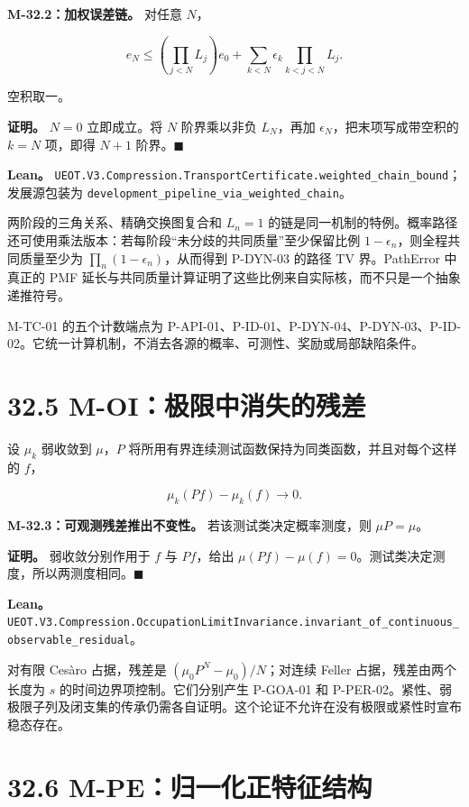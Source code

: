 \documentclass[
  11pt,
  oneside]{book}
\begin{document}
\textbf{M-32.2：加权误差链。} 对任意 \(N\)，

\[e_N\le \left(\prod_{j<N}L_j\right)e_0+
\sum_{k<N}\epsilon_k\prod_{k<j<N}L_j.\]

空积取一。

\textbf{证明。} \(N=0\) 立即成立。将 \(N\) 阶界乘以非负 \(L_N\)，再加 \(\epsilon_N\)，把末项写成带空积的 \(k=N\) 项，即得 \(N+1\) 阶界。\(\blacksquare\)

\textbf{Lean。} \nolinkurl{UEOT.V3.Compression.TransportCertificate.weighted_chain_bound}；发展源包装为 \nolinkurl{development_pipeline_via_weighted_chain}。

两阶段的三角关系、精确交换图复合和 \(L_n=1\) 的链是同一机制的特例。概率路径还可使用乘法版本：若每阶段``未分歧的共同质量''至少保留比例 \(1-\epsilon_n\)，则全程共同质量至少为 \(\prod_n(1-\epsilon_n)\)，从而得到 P-DYN-03 的路径 TV 界。PathError 中真正的 PMF 延长与共同质量计算证明了这些比例来自实际核，而不只是一个抽象递推符号。

M-TC-01 的五个计数端点为 P-API-01、P-ID-01、P-DYN-04、P-DYN-03、P-ID-02。它统一计算机制，不消去各源的概率、可测性、奖励或局部缺陷条件。

\section{32.5 M-OI：极限中消失的残差}\label{m-oiux6781ux9650ux4e2dux6d88ux5931ux7684ux6b8bux5dee}

设 \(\mu_k\) 弱收敛到 \(\mu\)，\(P\) 将所用有界连续测试函数保持为同类函数，并且对每个这样的 \(f\)，

\[\mu_k(Pf)-\mu_k(f)\longrightarrow0.\]

\hypertarget{m-32-3}{}\label{m-32-3}

\textbf{M-32.3：可观测残差推出不变性。} 若该测试类决定概率测度，则 \(\mu P=\mu\)。

\textbf{证明。} 弱收敛分别作用于 \(f\) 与 \(Pf\)，给出 \(\mu(Pf)-\mu(f)=0\)。测试类决定测度，所以两测度相同。\(\blacksquare\)

\textbf{Lean。} \nolinkurl{UEOT.V3.Compression.OccupationLimitInvariance.invariant_of_continuous_observable_residual}。

对有限 Cesàro 占据，残差是 \((\mu_0P^N-\mu_0)/N\)；对连续 Feller 占据，残差由两个长度为 \(s\) 的时间边界项控制。它们分别产生 P-GOA-01 和 P-PER-02。紧性、弱极限子列及闭支集的传承仍需各自证明。这个论证不允许在没有极限或紧性时宣布稳态存在。

\section{32.6 M-PE：归一化正特征结构}\label{m-peux5f52ux4e00ux5316ux6b63ux7279ux5f81ux7ed3ux6784}
\end{document}
